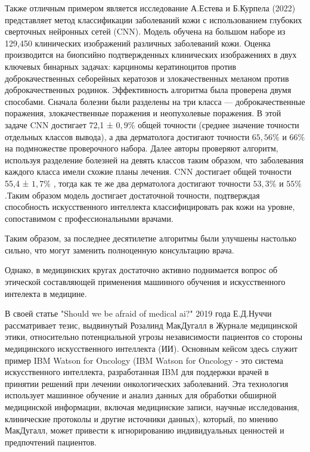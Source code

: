 \documentclass[14pt, a4paper]{extarticle}
\begin{document}
Также отличным примером является исследование А.Естева и Б.Курпела (2022)  \cite{esteva2017dermatologist} представляет метод классификации заболеваний кожи с использованием глубоких сверточных нейронных сетей (CNN). Модель обучена на большом наборе из 129,450 клинических изображений различных заболеваний кожи. Оценка производится на биопсийно подтвержденных клинических изображениях в двух ключевых бинарных задачах: карциномы кератиноцитов против доброкачественных себорейных кератозов и злокачественных меланом против доброкачественных родинок. Эффективность алгоритма была проверена двумя способами. Сначала болезни были разделены на три класса  — доброкачественные поражения, злокачественные поражения и неопухолевые поражения. В этой задаче CNN достигает 72,1 ± $0,9\%$  общей точности (среднее значение точности отдельных классов вывода), а два дерматолога достигают точности $65,56\%$  и $66\%$  на подмножестве проверочного набора. Далее авторы проверяют алгоритм, используя разделение болезней на девять классов таким образом, что заболевания каждого класса имели схожие планы лечения. CNN достигает общей точности 55,4 ± $1,7\%$ , тогда как те же два дерматолога достигают точности $53,3\%$  и $55\%$ .Таким образом модель достигает достаточной точности, подтверждая способность искусственного интеллекта классифицировать рак кожи на уровне, сопоставимом с профессиональными врачами. 


Таким образом, за последнее десятилетие алгоритмы были улучшены настолько сильно, что могут заменить полноценную консультацию врача.

 
Однако, в медицинских кругах достаточно активно поднимается вопрос об этической составляющей применения машинного обучения и искусственного интелекта в медицине.

В своей статье "Should we be afraid of medical ai?" 2019 года Е.Д.Нуччи \cite{di2019should} рассматривает тезис, выдвинутый Розалинд МакДугалл в Журнале медицинской этики, относительно потенциальной угрозы независимости пациентов со стороны медицинского искусственного интеллекта (ИИ). Основным кейсом здесь служит пример IBM Watson for Oncology (IBM Watson for Oncology - это система искусственного интеллекта, разработанная IBM для поддержки врачей в принятии решений при лечении онкологических заболеваний. Эта технология использует машинное обучение и анализ данных для обработки обширной медицинской информации, включая медицинские записи, научные исследования, клинические протоколы и другие источники данных), который, по мнению МакДугалл, может привести к игнорированию индивидуальных ценностей и предпочтений пациентов. 
\end{document}
